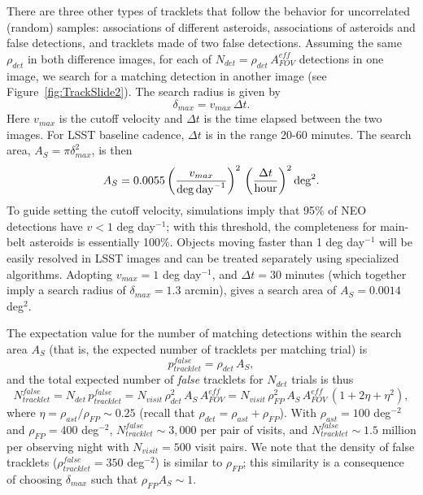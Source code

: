 There are three other types of tracklets that follow the behavior for uncorrelated (random)
samples: associations of different asteroids, associations of asteroids and false detections,
and tracklets made of two false detections. Assuming the same $\rho_{det}$ in both
difference images, for each of $N_{det} = \rho_{det} \, A_{FOV}^{eff}$ detections in one image,
we search for a matching detection in another image (see Figure~\ref{fig:TrackSlide2}).
The search radius is given by
\begin{equation}
                     \delta_{max} = v_{max} \, \Delta t .
\end{equation}
Here $v_{max}$ is the  cutoff velocity and $\Delta t$
is the time elapsed between the two images. For LSST baseline cadence, $\Delta t$ is in
the range 20-60 minutes. The search area, $A_S = \pi \delta_{max}^2$, is then
\begin{equation}
\label{eq:AS}
      A_S = 0.0055 \left( v_{max}  \over {\rm deg \, day}^{-1} \right)^2 \, \left(\Delta t \over {\rm hour} \right)^2 {\rm deg}^2.
\end{equation}
To guide setting the cutoff velocity, simulations imply that 95\% of NEO detections have $v<1$ deg day$^{-1}$; with this threshold,
the completeness for main-belt asteroids is essentially 100\%. Objects moving faster than 1 deg day$^{-1}$ will
be easily resolved in LSST images and can be treated separately using specialized algorithms.
Adopting $v_{max} = 1$ deg day$^{-1}$,  and $\Delta t = 30$
minutes (which together  imply a search radius of $\delta_{max} = 1.3$ arcmin), gives a search area of
$A_S = 0.0014$ deg$^2$.


The expectation value for the number of matching detections within the search area $A_S$ (that is, the expected
number of tracklets per matching trial) is
\begin{equation}
                      p_{tracklet}^{false} =   \rho_{det}  \, A_S,
\end{equation}
and the total expected number of {\it false} tracklets for $N_{det}$ trials is thus
\begin{equation}
\label{eq:NttFalse}
           N_{tracklet}^{false} = N_{det} \, p_{tracklet}^{false} =  N_{visit} \, \rho_{det}^2 \, A_S \, A_{FOV}^{eff} = N_{visit} \, \rho^2_{FP}  \, A_S \, A_{FOV}^{eff} \,  \left(1 + 2 \eta + \eta^2\right),
\end{equation}
where $\eta = \rho_{ast}  / \rho_{FP} \sim 0.25$ (recall that $\rho_{det} = \rho_{ast} + \rho_{FP}$).
With $\rho_{ast} = 100$ deg$^{-2}$ and  $\rho_{FP} = 400$ deg$^{-2}$,
$N_{tracklet}^{false} \sim 3,000$ per pair of visits, and $N_{tracklet}^{false} \sim 1.5$ million per observing night with
$N_{visit}=500$ visit pairs. We note that the density of false tracklets ($\rho_{tracklet}^{false}=350$ deg$^{-2}$) is similar to
$\rho_{FP}$; this similarity is a consequence of choosing $\delta_{max}$ such that $\rho_{FP} A_S \sim 1$.

